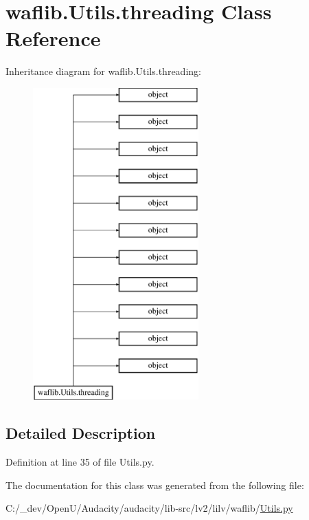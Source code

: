 \hypertarget{classwaflib_1_1_utils_1_1threading}{}\section{waflib.\+Utils.\+threading Class Reference}
\label{classwaflib_1_1_utils_1_1threading}
Inheritance diagram for waflib.\+Utils.\+threading\+:\begin{figure}[H]
\begin{center}
\leavevmode
\includegraphics[height=12.000000cm]{classwaflib_1_1_utils_1_1threading}
\end{center}
\end{figure}


\subsection{Detailed Description}


Definition at line 35 of file Utils.\+py.



The documentation for this class was generated from the following file\+:\begin{DoxyCompactItemize}
\item 
C\+:/\+\_\+dev/\+Open\+U/\+Audacity/audacity/lib-\/src/lv2/lilv/waflib/\hyperlink{lilv_2waflib_2_utils_8py}{Utils.\+py}\end{DoxyCompactItemize}

